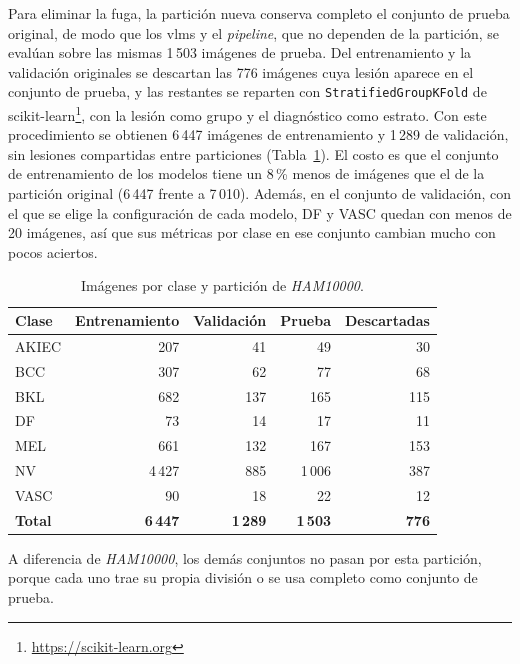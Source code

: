 Para eliminar la fuga, la partición nueva conserva completo el conjunto de prueba original, de modo que los \glspl{vlm} y el \emph{pipeline}, que no dependen de la partición, se evalúan sobre las mismas 1\,503 imágenes de prueba. Del entrenamiento y la validación
originales se descartan las 776 imágenes cuya lesión aparece en el conjunto de prueba, y las restantes se reparten con \texttt{StratifiedGroupKFold} de scikit-learn\footnote{\url{https://scikit-learn.org}}, con la lesión como grupo y el diagnóstico como estrato.
Con este procedimiento se obtienen 6\,447 imágenes de entrenamiento y 1\,289 de validación, sin lesiones compartidas entre particiones
(Tabla~\ref{tab:met_tamanos}). El costo es que el conjunto de entrenamiento de los modelos tiene un 8\,\% menos de imágenes que el de la partición
original (6\,447 frente a 7\,010). Además, en el conjunto de validación, con el que se elige la configuración de cada
modelo, DF y VASC quedan con menos de 20 imágenes, así que sus métricas por clase en ese conjunto cambian mucho con
pocos aciertos.

\begin{table}[H]
    \centering
    \caption{Imágenes por clase y partición de \emph{HAM10000}.}
    \label{tab:met_tamanos}
    \begin{tabularx}{\textwidth}{@{}>{\raggedright\arraybackslash}X r r r r@{}}
        \toprule
        \textbf{Clase} & \textbf{Entrenamiento} & \textbf{Validación} & \textbf{Prueba} & \textbf{Descartadas} \\
        \midrule
        AKIEC & 207 & 41 & 49 & 30 \\
        BCC & 307 & 62 & 77 & 68 \\
        BKL & 682 & 137 & 165 & 115 \\
        DF & 73 & 14 & 17 & 11 \\
        MEL & 661 & 132 & 167 & 153 \\
        NV & 4\,427 & 885 & 1\,006 & 387 \\
        VASC & 90 & 18 & 22 & 12 \\
        \midrule
        \textbf{Total} & \textbf{6\,447} & \textbf{1\,289} & \textbf{1\,503} & \textbf{776} \\
        \bottomrule
    \end{tabularx}
\end{table}

A diferencia de \emph{HAM10000}, los demás conjuntos no pasan por esta partición, porque cada uno trae su propia
división o se usa completo como conjunto de prueba.

